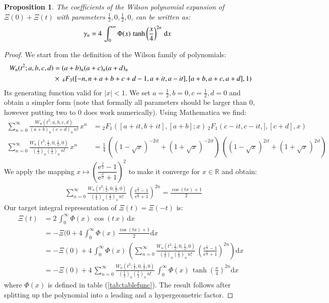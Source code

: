 \documentclass[a4paper,11pt,twoside]{amsart}
\newtheorem{proposition}[theorem]{Proposition}
\begin{document}
\begin{proposition}
The coefficients of the Wilson polynomial expansion of $\Xi(0) +\Xi(t)$ with parameters $\frac12,0,\frac12,0$, can be written as:   
\begin{align}
\gamma_n &= 4\,\int_{0}^\infty \Phi(x)\,\tanh\left(\frac{x}{4}\right)^{2n}\, \mathrm{d}x \notag
\end{align}
\end{proposition}
\begin{proof}
We start from the definition of the Wilson family of polynomials:
\begin{align}
 W_n(t^2;a,b,c,d) &= (a+b)_n(a+c)_n(a+d)_n\, \\
  &\times\, {}_4F_3([-n, n+ a+b+c+d-1,a+it, a- it], [a+b, a+c, a+d], 1) \notag
\end{align}
Its generating function valid for $|x| < 1$. We set $a=\frac12,b=0,c=\frac12,d=0$ and obtain a simpler form (note that formally all parameters should be larger than $0$, however putting two to $0$ does work numerically). Using Mathematica we find:
\begin{align}
 \sum_{n=0}^\infty \frac{W_n(t^2;a,b,c,d)}{(a+b)_n(c+d)_n\,n!}\, x^n &= {}_2F_1\left([a+it, b+it],[a+b] ;x\right)\,{}_2F_1\left(c-it, c-it,],[c+d],x\right) \\
 \sum_{n=0}^\infty \frac{W_n\left(t^2;\frac12,0,\frac12,0\right)}{\left(\frac12\right)_n\left(\frac12\right)_n\,n!}\,x^n&= \frac14\,\left((1-\sqrt{x})^{-2it}+(1+\sqrt{x})^{-2it}\right)\,\left((1-\sqrt{x})^{2it}+(1+\sqrt{x})^{2it}\right)
\end{align} 
We apply the mapping $x \mapsto \left(\dfrac{\textrm{e}^{\frac{x}{2}}-1}{\textrm{e}^{\frac{x}{2}}+1}\right)^2$ to make it converge for $x \in \mathbb{R}$ and obtain: 
\begin{align}
 &\sum_{n=0}^\infty \frac{W_n\left(t^2;\frac12,0,\frac12,0\right)}{\left(\frac12\right)_n\left(\frac12\right)_n\,n!}\, \left(\frac{\textrm{e}^{\frac{x}{2}}-1}{\textrm{e}^{\frac{x}{2}}+1}\right)^{2n} = \frac{\cos(tx)+1}{2}
\end{align}
Our target integral representation of $\Xi(t) = \Xi(-t)$ is:
\begin{align}
 \Xi(t) &= 2\,\int_{0}^\infty \Phi(x)\,\cos(t\,x)\, \mathrm{d}x \\
  &=-\Xi(0 +4\,\int_{0}^\infty \Phi(x)\, \frac{\cos(tx)+1}{2}  \mathrm{d}x\\
  &=-\Xi(0)+4\,\int_{0}^\infty \Phi(x)\,\left(\sum_{n=0}^\infty \frac{W_n\left(t^2;\frac12,0,\frac12,0\right)}{\left(\frac12\right)_n\left(\frac12\right)_n\,n!}\, \left(\frac{\textrm{e}^{\frac{x}{2}}-1}{\textrm{e}^{\frac{x}{2}}+1}\right)^{2n}\right) \mathrm{d}x \\
  &=-\Xi(0)+4\, \sum_{n=0}^\infty \frac{W_n\left(t^2;\frac12,0,\frac12,0\right)}{\left(\frac12\right)_n\left(\frac12\right)_n\,n!}\,\int_{0}^\infty \Phi(x)\,\tanh\left(\frac{x}{4}\right)^{2n} \mathrm{d}x
\end{align}
where $\Phi(x)$ is defined in table (\ref{tab:tablefunc}). The result follows after splitting up the polynomial into a leading and a hypergeometric factor.
\end{proof}
\end{document}

